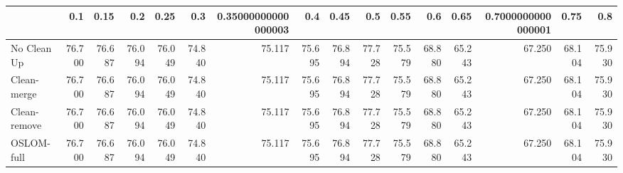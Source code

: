 \begin{tabular}{lrrrrrrrrrrrrrrr}
\toprule
{} &    0.1 &   0.15 &    0.2 &   0.25 &    0.3 & 0.35000000000000003 &    0.4 &   0.45 &    0.5 &   0.55 &    0.6 &   0.65 & 0.7000000000000001 &   0.75 &    0.8 \\
\midrule
No Clean Up  & 76.700 & 76.687 & 76.094 & 76.049 & 74.840 &              75.117 & 75.695 & 76.894 & 77.728 & 75.579 & 68.880 & 65.243 &             67.250 & 68.104 & 75.930 \\
Clean-merge  & 76.700 & 76.687 & 76.094 & 76.049 & 74.840 &              75.117 & 75.695 & 76.894 & 77.728 & 75.579 & 68.880 & 65.243 &             67.250 & 68.104 & 75.930 \\
Clean-remove & 76.700 & 76.687 & 76.094 & 76.049 & 74.840 &              75.117 & 75.695 & 76.894 & 77.728 & 75.579 & 68.880 & 65.243 &             67.250 & 68.104 & 75.930 \\
OSLOM-full   & 76.700 & 76.687 & 76.094 & 76.049 & 74.840 &              75.117 & 75.695 & 76.894 & 77.728 & 75.579 & 68.880 & 65.243 &             67.250 & 68.104 & 75.930 \\
\bottomrule
\end{tabular}
